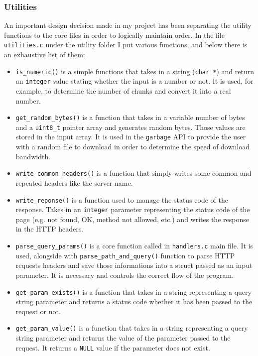 \documentclass{article}
\begin{document}
\subsubsection{Utilities}
An important design decision made in my project has been separating the utility functions to the core files in order to logically maintain order.
In the file \texttt{utilities.c} under the utility folder I put various functions, and below there is an exhaustive list of them:

\begin{itemize}
\item \texttt{is\_numeric()} is a simple functions that takes in a string (\texttt{char *}) and return an \texttt{integer} value stating whether the input is a number or not. It is used, for example, to determine the number of chunks and convert it into a real number.
\item \texttt{get\_random\_bytes()} is a function that takes in a variable number of bytes and a \texttt{uint8\_t} pointer array and generates random bytes. Those values are stored in the input array. It is used in the \texttt{garbage} API to provide the user with a random file to download in order to determine the speed of download bandwidth.
\item \texttt{write\_common\_headers()} is a function that simply writes some common and repeated headers like the server name.
\item \texttt{write\_reponse()} is a function used to manage the status code of the response. Takes in an \texttt{integer} parameter representing the status code of the page (e.g. not found, OK, method not allowed, etc.) and writes the response in the HTTP headers.
\item \texttt{parse\_query\_params()} is a core function called in \texttt{handlers.c} main file. It is used, alongside with \texttt{parse\_path\_and\_query()} function to parse HTTP requests headers and save those informations into a struct passed as an input parameter. It is necessary and controls the correct flow of the program.
\item \texttt{get\_param\_exists()} is a function that takes in a string representing a query string parameter and returns a status code whether it has been passed to the request or not.
\item \texttt{get\_param\_value()} is a function that takes in a string representing a query string parameter and returns the value of the parameter passed to the request. It returns a \texttt{NULL} value if the parameter does not exist.

\end{itemize}
\end{document}
